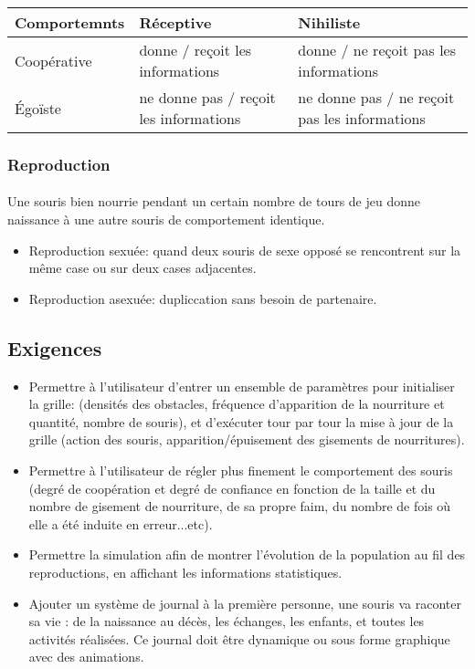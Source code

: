 \begin{center}
\begin{tabular} {|p{2.5cm}|p{6cm}|p{7.2cm}|}
\hline
Comportemnts & Réceptive & Nihiliste \\
\hline
Coopérative & donne / reçoit les informations & donne / ne
reçoit pas les
informations\\
\hline
Égoïste & ne donne pas / reçoit les
informations & ne donne pas / ne reçoit pas les informations\\
\hline
\end{tabular}
\end{center}
 

\subsubsection{Reproduction}
\label{subsubsec:rep}
\paragraph{} Une souris bien nourrie pendant un certain nombre de tours de jeu donne naissance à une autre souris de comportement identique.
\begin{itemize}
\item Reproduction sexuée: quand deux souris de sexe opposé se rencontrent sur la même case ou sur deux cases adjacentes.
\item Reproduction asexuée: dupliccation sans besoin de partenaire.
\end{itemize}

\subsection{Exigences}
\begin{itemize}
	\item Permettre à l’utilisateur d’entrer un ensemble de paramètres pour initialiser la grille: (densités des obstacles, fréquence d'apparition de la nourriture et quantité, nombre de souris), et d'exécuter tour par tour la mise à jour de la grille (action des souris, apparition/épuisement des gisements de nourritures).
	\item Permettre à l'utilisateur de régler plus finement le comportement des souris (degré de coopération et degré de confiance en fonction de la taille et du nombre de gisement de nourriture, de sa propre faim, du nombre de fois où elle a été induite en erreur...etc).
    \item Permettre la simulation afin de montrer l'évolution de la population au fil des reproductions, en affichant les informations statistiques.
    \item Ajouter un système de journal à la première personne, une souris va raconter sa vie : de la naissance au décès, les échanges, les enfants, et toutes les activités réalisées. Ce journal doit être dynamique ou sous forme graphique avec des animations.
\end{itemize}